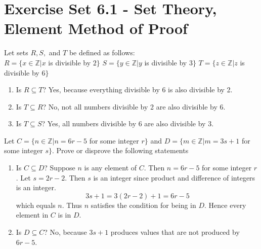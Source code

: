 \documentclass[12pt]{article}
\newenvironment{modenumerate}
  {\enumerate\setupmodenumerate}
  {\endenumerate}
\newif\ifmoditem
\newcommand{\setupmodenumerate}{%
  \global\moditemfalse
  \let\origmakelabel\makelabel
  \def\moditem##1{\global\moditemtrue\def\mesymbol{##1}\item}%
  \def\makelabel##1{%
    \origmakelabel{##1\ifmoditem\rlap{\mesymbol}\fi\enspace}%
    \global\moditemfalse}%
}
\begin{document}

\setcounter{section}{6}
\section*{Exercise Set 6.1 - Set Theory, Element Method of Proof}
\begin{modenumerate}
  \setcounter{enumi}{2}
\item %
Let sets $R, S,$ and $T$ be defined as follows:\\
$R = \{x \in \mathbb{Z} | x$ is divisible by $2\}$
$S = \{y \in \mathbb{Z} | y$ is divisible by $3\}$
$T = \{z \in \mathbb{Z} | z$ is divisible by $6\}$
\begin{enumerate}
\item Is $R \subseteq T$? Yes, because everything divisible by 6 is also divisible by 2.
\item Is $T \subseteq R$? No, not all numbers divisible by 2 are also divisible by 6.
\item Is $T \subseteq S$? Yes, all numbers divisible by 6 are also divisible by 3.
\end{enumerate}
  \setcounter{enumi}{4}
\item %
Let $C = \{n \in \mathbb{Z} | n = 6r - 5$ for some integer $r\}$ and $D = \{m \in \mathbb{Z} | m = 3s + 1$ for
some integer $s \}$. Prove or disprove the following statements
\begin{enumerate}
\item Is $C \subseteq D$?  %
Suppose $n$ is any element of $C$. Then $n = 6r - 5$ for some integer $r$. Let $s = 2r - 2$. Then $s$ is an
integer since product and difference of integers is an integer.
$$3s + 1 = 3(2r-2)+1 = 6r-5$$
which equals $n$. Thus $n$ satisfies the condition for being in $D$. Hence every element in $C$ is in $D$.
\item Is $D \subseteq C$?  No, because $3s+1$ produces values that are not produced by $6r-5$.
\end{enumerate}


\end{modenumerate}
\end{document}
